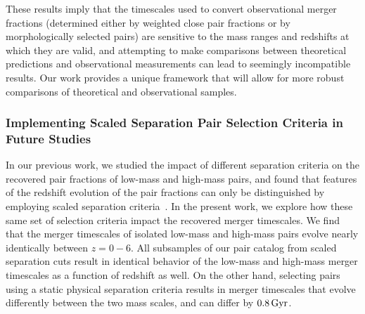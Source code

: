\documentclass[twocolumn,linenumbers]{aastex631}
\begin{document}
            These results imply that the timescales used to convert observational merger fractions (determined either by weighted close pair fractions or by morphologically selected pairs) are sensitive to the mass ranges and redshifts at which they are valid, and attempting to make comparisons between theoretical predictions and observational measurements can lead to seemingly incompatible results. 
            Our work provides a unique framework that will allow for more robust comparisons of theoretical and observational samples. 

        \subsubsection{Implementing Scaled Separation Pair Selection Criteria in Future Studies}
            In our previous work, we studied the impact of different separation criteria on the recovered pair fractions of low-mass and high-mass pairs, and found that features of the redshift evolution of the pair fractions can only be distinguished by employing scaled separation criteria~\citep{Chamberlain2024}. 
            In the present work, we explore how these same set of selection criteria impact the recovered merger timescales. 
            We find that the merger timescales of isolated low-mass and high-mass pairs evolve nearly identically between $z=0-6$.
            All subsamples of our pair catalog from scaled separation cuts result in identical behavior of the low-mass and high-mass merger timescales as a function of redshift as well. 
            On the other hand, selecting pairs using a static physical separation criteria results in merger timescales that evolve differently between the two mass scales, and can differ by $0.8\mathrm{\,Gyr}$. 
            
\end{document}

